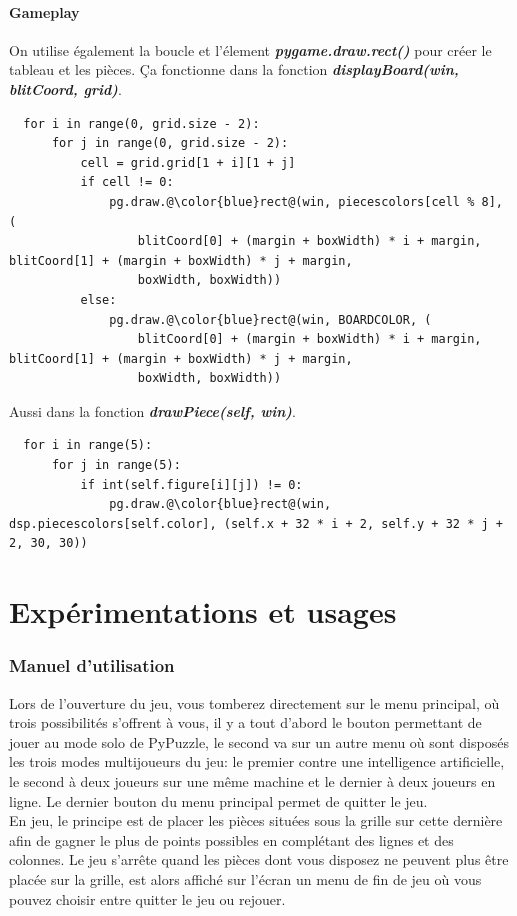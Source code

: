 \documentclass[a4paper]{report}
\begin{document}
\subsection{Gameplay}
On utilise également la boucle et l'élement \textbf{\textit{pygame.draw.rect()}} pour créer le tableau et les pièces.
Ça fonctionne dans la fonction \textbf{\textit{displayBoard(win, blitCoord, grid)}}.
\begin{lstlisting}
  for i in range(0, grid.size - 2):
      for j in range(0, grid.size - 2):
          cell = grid.grid[1 + i][1 + j]
          if cell != 0:
              pg.draw.@\color{blue}rect@(win, piecescolors[cell % 8], (
                  blitCoord[0] + (margin + boxWidth) * i + margin, blitCoord[1] + (margin + boxWidth) * j + margin,
                  boxWidth, boxWidth))
          else:
              pg.draw.@\color{blue}rect@(win, BOARDCOLOR, (
                  blitCoord[0] + (margin + boxWidth) * i + margin, blitCoord[1] + (margin + boxWidth) * j + margin,
                  boxWidth, boxWidth))
\end{lstlisting}
Aussi dans la fonction \textbf{\textit{drawPiece(self, win)}}.
\begin{lstlisting}
  for i in range(5):
      for j in range(5):
          if int(self.figure[i][j]) != 0:
              pg.draw.@\color{blue}rect@(win, dsp.piecescolors[self.color], (self.x + 32 * i + 2, self.y + 32 * j + 2, 30, 30))
\end{lstlisting}


\part{Expérimentations et usages}
\section{Manuel d'utilisation}
Lors de l'ouverture du jeu, vous tomberez directement sur le menu principal, où trois possibilités s'offrent à vous, il y a tout d'abord le bouton permettant de jouer au mode solo de PyPuzzle, le second va sur un autre menu où sont disposés les trois modes multijoueurs du jeu: le premier contre une intelligence artificielle, le second à deux joueurs sur une même machine et le dernier à deux joueurs en ligne. Le dernier bouton du menu principal permet de quitter le jeu. \\

En jeu, le principe est de placer les pièces situées sous la grille sur cette dernière afin de gagner le plus de points possibles en complétant des lignes et des colonnes. Le jeu s'arrête quand les pièces dont vous disposez ne peuvent plus être placée sur la grille, est alors affiché sur l'écran un menu de fin de jeu où vous pouvez choisir entre quitter le jeu ou rejouer. 
\end{document}
